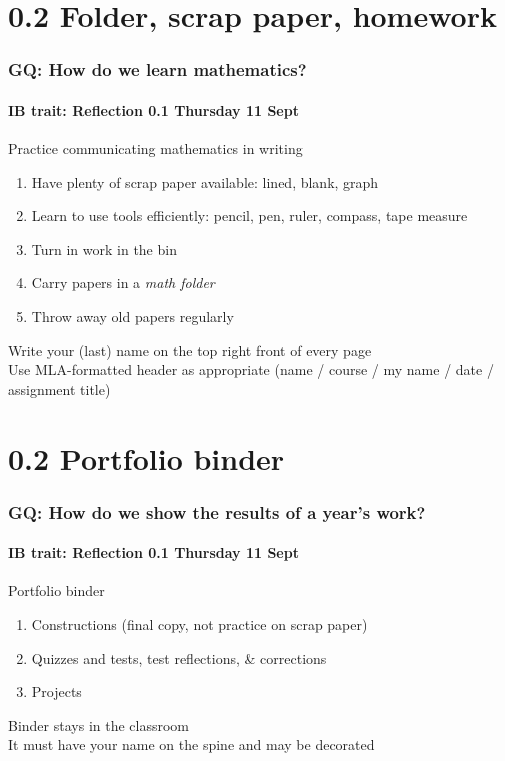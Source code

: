 \documentclass{beamer}
\begin{document}
\section{0.2 Folder, scrap paper, homework}
  \frame
  {
    \frametitle{GQ: How do we learn mathematics?}
    \framesubtitle{IB trait: Reflection \hfill \alert{0.1 Thursday 11 Sept}}

    \begin{block}{Practice communicating mathematics in writing}
      \begin{enumerate}
        \item Have plenty of scrap paper available: lined, blank, graph
        \item Learn to use tools efficiently: pencil, pen, ruler, compass, tape measure
        \item Turn in work in the bin
        \item Carry papers in a \emph{math folder}
        \item Throw away old papers regularly
      \end{enumerate}
    \end{block}
    Write your (last) name on the top right front of every page\\[0.25cm]
    Use MLA-formatted header as appropriate (name / course / my name / date / assignment title)
  }

\section{0.2 Portfolio binder}
  \frame
  {
    \frametitle{GQ: How do we show the results of a year's work?}
    \framesubtitle{IB trait: Reflection \hfill \alert{0.1 Thursday 11 Sept}}

    \begin{block}{Portfolio binder}
      \begin{enumerate}
        \item Constructions (final copy, not practice on scrap paper)
        \item Quizzes and tests, test reflections, \& corrections
        \item Projects
      \end{enumerate}
    \end{block}
    Binder stays in the classroom\\[0.25cm]
    It must have your name on the spine and may be decorated
  }
\end{document}
